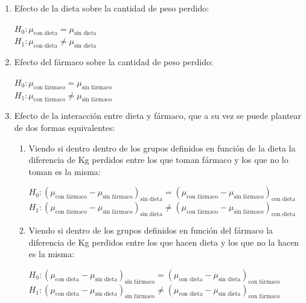 \documentclass[
  spanish,
  a4paper,
]{scrreport}
\theoremstyle{plain}
\theoremstyle{definition}
\theoremstyle{definition}
\theoremstyle{remark}
\begin{document}
\begin{enumerate}
\def\labelenumi{\arabic{enumi}.}
\item
  Efecto de la dieta sobre la cantidad de peso perdido:

  \(H_0: \mu_{\text{con dieta}}=\mu_{\text{sin dieta}}\)\\
  \(H_1: \mu_{\text{con dieta}}\neq\mu_{\text{sin dieta}}\)
\item
  Efecto del fármaco sobre la cantidad de peso perdido:

  \(H_0: \mu_{\text{con fármaco}}=\mu_{\text{sin fármaco}}\)\\
  \(H_1: \mu_{\text{con fármaco}}\neq\mu_{\text{sin fármaco}}\)
\item
  Efecto de la interacción entre dieta y fármaco, que a su vez se puede
  plantear de dos formas equivalentes:

  \begin{enumerate}
  \def\labelenumii{\alph{enumii}.}
  \item
    Viendo si dentro dentro de los grupos definidos en función de la
    dieta la diferencia de Kg perdidos entre los que toman fármaco y los
    que no lo toman es la misma:

    \(H_0: (\mu_{\text{con fármaco}}-\mu_{\text{sin fármaco}})_{\text{sin dieta}}=(\mu_{\text{con fármaco}}-\mu_{\text{sin fármaco}})_{\text{con dieta}}\)\\
    \(H_1: (\mu_{\text{con fármaco}}-\mu_{\text{sin fármaco}})_{\text{sin dieta}}\neq(\mu_{\text{con fármaco}}-\mu_{\text{sin fármaco}})_{\text{con dieta}}\)
  \item
    Viendo si dentro de los grupos definidos en función del fármaco la
    diferencia de Kg perdidos entre los que hacen dieta y los que no la
    hacen es la misma:

    \(H_0: (\mu_{\text{con dieta}}-\mu_{\text{sin dieta}})_{\text{sin fármaco}}=(\mu_{\text{con dieta}}-\mu_{\text{sin dieta}})_{\text{con fármaco}}\)\\
    \(H_1: (\mu_{\text{con dieta}}-\mu_{\text{sin dieta}})_{\text{sin fármaco}}\neq(\mu_{\text{con dieta}}-\mu_{\text{sin dieta}})_{\text{con fármaco}}\)
  \end{enumerate}
\end{enumerate}
\end{document}

